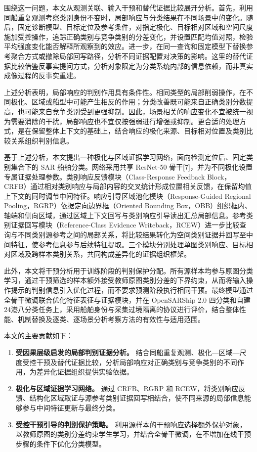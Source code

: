 \documentclass[journal,10pt,a4paper]{IEEEtran}
\begin{document}
围绕这一问题，本文从观测关联、输入干预和替代证据比较展开分析。首先，利用同船重复观测考察类别身份不变时，局部响应与分类结果在不同场景中的变化。随后，固定诊断模型、目标定位及参考条件，对指定极化、目标相对区域和空间尺度施加受控操作，追踪正确类别与竞争类别的分差变化，并设置匹配均值对照，检验平均强度变化能否解释所观察到的效应。进一步，在同一查询和固定模型下替换参考聚合方式或撤除局部回写路径，分析不同证据配置对决策的影响。这里的替代证据比较借鉴反事实提问方式，分析对象限定为分类系统内部的信息依赖，而非真实成像过程的反事实重建。

上述分析表明，局部响应的判别作用具有条件性。相同类型的局部削弱操作，在不同极化、区域或船型中可能产生相反的作用；分类改善既可能来自正确类别分数提高，也可能来自竞争类别受到更强抑制。因此，场景相关的响应变化不宜被统一视为需要消除的干扰，局部响应也不宜仅按强弱进行增强或抑制。更合适的处理方式，是在保留整体上下文的基础上，结合响应的极化来源、目标相对位置及类别比较关系组织判别信息。

基于上述分析，本文提出一种极化与区域证据学习网络，面向检测定位后、固定类别集合下的 SAR 船舶分类。网络采用共享 ResNet-50 骨干{[}7{]}，并为不同极化设置专属证据处理参数。类别响应反馈模块（Class-Response Feedback Block，CRFB）通过相对类别响应与局部内容的交叉统计形成位置相关反馈，在保留均值上下文的同时调节中间特征。响应引导区域池化模块（Response-Guided Regional Pooling，RGRP）依据定向边界框（Oriented Bounding Box，OBB）组织框内、轴端和侧向区域，通过区域上下文回写与类别响应引导读出汇总局部信息。参考类别证据回写模块（Reference-Class Evidence Writeback，RCEW）进一步比较查询与不同类别源参考之间的局部关系，将比较结果转化为空间类别证据并回写至中间特征，使参考信息参与后续特征提取。三个模块分别处理单图类别响应、目标相对区域及跨样本类别关系，共同构成差异化的证据组织框架。

此外，本文将干预分析用于训练阶段的判别保护分配。所有源样本均参与原图分类学习，通过干预筛选的样本额外接受教师原图类别分差的下界约束，从而将输入操作揭示的判别信息引入优化过程，而不要求预测阶段执行相同干预。最终模型通过全骨干微调联合优化特征表征与证据模块，并在 OpenSARShip 2.0 四分类和自建24港八分类任务上，采用船舶身份与采集过境隔离的协议进行评价，结合整体性能、机制替换及逐类、逐场景分析考察方法的有效性与适用范围。

本文的主要贡献如下：

\begin{enumerate}
\def\labelenumi{\arabic{enumi}.}
\item
  \textbf{受因果层级启发的局部判别证据分析。} 结合同船重复观测、极化---区域---尺度受控干预及替代证据比较，分析局部响应对正确类别与竞争类别的不同作用，为差异化证据组织提供实验依据。
\item
  \textbf{极化与区域证据学习网络。} 通过 CRFB、RGRP 和 RCEW，将类别响应反馈、结构化区域取证与源参考类别证据回写相结合，使不同来源的局部信息能够参与中间特征更新与最终分类。
\item
  \textbf{受控干预引导的判别保护策略。} 利用源样本的干预响应选择额外保护对象，以教师原图的类别分差约束学生学习，并结合全骨干微调，在不增加在线干预步骤的条件下优化分类模型。
\end{enumerate}
\end{document}

